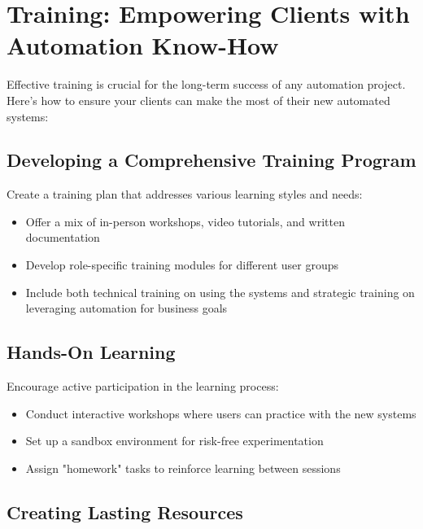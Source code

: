 
\section{Training: Empowering Clients with Automation Know-How}

Effective training is crucial for the long-term success of any automation project. Here's how to ensure your clients can make the most of their new automated systems:

\subsection{Developing a Comprehensive Training Program}

Create a training plan that addresses various learning styles and needs:

\begin{itemize}
    \item Offer a mix of in-person workshops, video tutorials, and written documentation
    \item Develop role-specific training modules for different user groups
    \item Include both technical training on using the systems and strategic training on leveraging automation for business goals
\end{itemize}

\subsection{Hands-On Learning}

Encourage active participation in the learning process:

\begin{itemize}
    \item Conduct interactive workshops where users can practice with the new systems
    \item Set up a sandbox environment for risk-free experimentation
    \item Assign "homework" tasks to reinforce learning between sessions
\end{itemize}

\subsection{Creating Lasting Resources}

